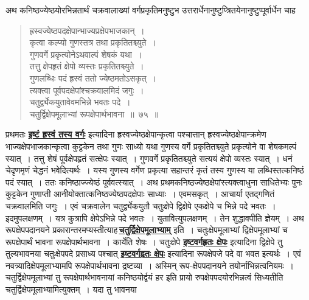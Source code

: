 \documentclass[11pt, openany]{book}
\begin{document}
\vspace{-2mm}
 अथ कनिष्ठज्येष्ठयोरभिन्नतार्थं चक्रवालाख्यां वर्गप्रकृतिमनुष्टुभ
उत्तरार्धेनानुष्टुप्त्रितयेनानुष्टुप्पूर्वार्धेन चाह\textendash\
\newpage

 \label{75}
\begin{quote}
    \ab 
      ह्रस्वज्येष्ठपदक्षेपान्भाज्यप्रक्षेपभाजकान्~। \\
 कृत्वा कल्प्यो गुणस्तत्र तथा प्रकृतितश्च्युते~। \\
 गुणवर्गे प्रकृत्योनेऽथवाल्पं शेषकं यथा~। \\
 तत्तु क्षेपहृतं क्षेपो व्यस्तः प्रकृतितश्च्युते~। \\
 गुणलब्धिः पदं ह्रस्वं ततो ज्येष्ठमतोऽसकृत्~। \\
 त्यक्त्वा पूर्वपदक्षेपांश्चक्रवालमिदं जगुः~। \\
 चतुर्द्व्येकयुतावेवमभिन्ने भवतः पदे~। \\
 चतुर्द्विक्षेपमूलाभ्यां रूपक्षेपार्थभावना~॥~७५~॥~
\end{quote}

 प्रथमतः \hyperref[70]{\textbf{इष्टं ह्रस्वं तस्य वर्गः}} इत्यादिना
ह्रस्वज्येष्ठक्षेपान्कृत्वा पश्चात्तान् ह्रस्वज्येष्ठक्षेपान्क्रमेण भाज्यक्षेपभाजकान्कृत्वा कुट्टकेन तथा गुणः साध्यो यथा  गुणस्य वर्गे प्रकृतितश्च्युते प्रकृत्योने वा शेषकमल्पं स्यात्~। तत्तु
शेषं पूर्वक्षेपहृतं सत्क्षेपः स्यात्~। गुणवर्गे प्रकृतितश्च्युते सत्ययं
क्षेपो व्यस्तः स्यात्~। 
धनं चेदृणमृणं चेद्धनं भवेदित्यर्थः~। यस्य गुणस्य वर्गेण प्रकृत्या
सहान्तरं कृतं तस्य गुणस्य या लब्धिस्तत्कनिष्ठं पदं स्यात्~। ततः
कनिष्ठाज्ज्येष्ठं 
पूर्ववत्स्यात्~। अथ प्रथमकनिष्ठज्येष्ठक्षेपांस्त्यक्त्वाधुना
साधितेभ्यः पुनः कुट्टकेन 
गुणाप्ती आनीयोक्तात्कनिष्ठज्येष्ठपदक्षेपाः साध्याः~। एवमसकृत्~। आचार्या
एतद्गणितं चक्रवालमिति जगुः~। एवं चक्रवालेन चतुर्द्व्येकयुतौ चतुःक्षेपे
द्विक्षेपे एकक्षेपे च भिन्ने पदे भवतः~। इदमुपलक्षणम्~। यत्र कुत्रापि क्षेपेऽभिन्ने
पदे भवतः~। युतावित्युपलक्षणम्~। तेन शुद्धावपीति ज्ञेयम्~। अथ
रूपक्षेपपदानयने प्रकारान्तरमप्यस्तीत्याह\textendash \,\hyperref[75]{\textbf{चतुर्द्विक्षेपमूलाभ्याम्}} इति~।
चतुःक्षेपमूलाभ्यां द्विक्षेपमूलाभ्यां 
च रूपक्षेपार्थं भावना रूपक्षेपार्थभावना~। कार्येति शेषः~।
चतुःक्षेपे \hyperref[72]{\textbf{इष्टवर्गहृतः क्षेपः}} इत्यादिना द्विक्षेपे तु तुल्यभावनया चतुःक्षेपपदे प्रसाध्य
पश्चात् \hyperref[72]{\textbf{इष्टवर्गहृतः क्षेपः}} इत्यादिना रूपक्षेपजे पदे वा भवत इत्यर्थः~। एवं
नवत्र्यादिक्षेपमूलाभ्यामपि 
रूपक्षेपार्थभावना द्रष्टव्या~। अस्मिन् रूप-क्षेपपदानयने
तयोर्नाभिन्नत्वनियमः~। 
चतुर्द्विक्षेपमूलाभ्यां तु रूपक्षेपार्थभावनायां कनिष्ठयोर्द्वयं हर इति
प्रायो रुपक्षेपपदयोरभिन्नत्वं सिध्यतीति चतुर्द्विक्षेपमूलाभ्यामित्युक्तम्~।
यदा तु भावनया
 \newpage
\end{document}
